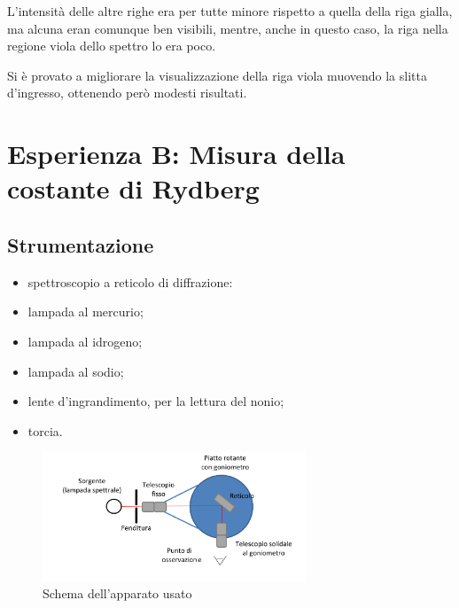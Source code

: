 \documentclass[a4paper,10pt]{article}
\begin{document}
{{{{{{L'intensità delle altre righe era per tutte minore rispetto a quella della riga gialla, ma alcuna eran comunque ben visibili, mentre, anche in questo caso, la riga nella regione viola dello spettro lo era poco.

Si è provato a migliorare la visualizzazione della riga viola muovendo la slitta d'ingresso, ottenendo però modesti risultati.

\section{Esperienza B: Misura della costante di Rydberg}

\subsection{Strumentazione}

\begin{itemize}
	\item spettroscopio a reticolo di diffrazione:

	\item lampada al mercurio;
	\item lampada al idrogeno;
	\item lampada al sodio;
	\item lente d'ingrandimento, per la lettura del nonio;
	\item torcia.
\end{itemize}

\begin{figure}[H]
	\centering
	\includegraphics[width=0.7\textwidth]{../grafici/Schema2.png}
	\caption{Schema dell'apparato usato}
	\label{fig:schema2}
\end{figure}

}}}}}}
\end{document}
